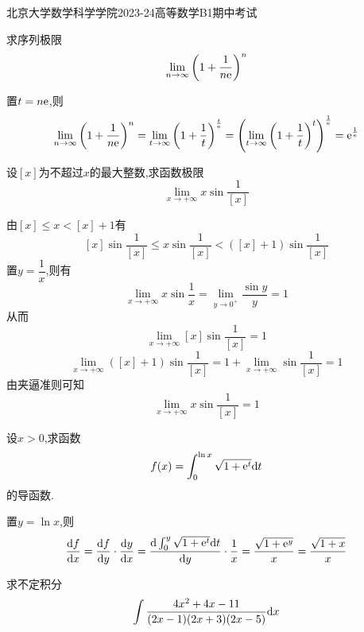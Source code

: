 \documentclass{ctexart}
\begin{document}
\pagestyle{empty}
\begin{center}\Large
    北京大学数学科学学院2023-24高等数学B1期中考试
\end{center}
\begin{problem}[1.(10\songti{分})]
    求序列极限$$\lim_{n\to\infty}{\left(1+\dfrac{1}{n\mathrm{e}}\right)^n}$$
\end{problem}
\begin{solution}
    置$t=n\mathrm{e}$,则
    $$
    \lim_{n\to\infty}{\left(1+\dfrac{1}{n\mathrm{e}}\right)^n}
    =\lim_{t\to\infty}{\left(1+\dfrac{1}{t}\right)^{\frac{t}{\mathrm{e}}}}
    =\left(\lim_{t\to\infty}{\left(1+\dfrac{1}{t}\right)^t}\right)^{\frac{1}{\mathrm{e}}}
    =\mathrm{e}^{\frac{1}{\mathrm{e}}}
    $$
\end{solution}
\begin{problem}[2.(10\songti{分})]
    设$[x]$为不超过$x$的最大整数,求函数极限$$\lim_{x\to+\infty}{x\sin{\dfrac{1}{[x]}}}$$
\end{problem}
\begin{solution}
    由$[x]\leqslant x<[x]+1$有
    $$[x]\sin{\dfrac{1}{[x]}}\leqslant x\sin{\dfrac{1}{[x]}}<([x]+1)\sin{\dfrac{1}{[x]}}$$
    置$y=\dfrac{1}{x}$,则有$$\lim_{x\to+\infty}{x\sin{\dfrac{1}{x}}}=\lim_{y\to 0^+}{\dfrac{\sin y}{y}}=1$$
    从而$$\lim_{x\to+\infty}{[x]\sin{\dfrac{1}{[x]}}}=1$$
    $$\lim_{x\to+\infty}{([x]+1)\sin{\dfrac{1}{[x]}}}=1+\lim_{x\to+\infty}{\sin{\dfrac{1}{[x]}}}=1$$
    由夹逼准则可知$$\lim_{x\to+\infty}{x\sin{\dfrac{1}{[x]}}}=1$$
\end{solution}
\begin{problem}[3.(10\songti{分})]
    设$x>0$,求函数$$f(x)=\int_{0}^{\ln{x}}{\sqrt{1+\mathrm{e}^t}\mathrm{d} t}$$的导函数.
\end{problem}
\begin{solution}
    置$y=\ln{x}$,则
    $$\dfrac{\mathrm{d} f}{\mathrm{d} x}=\dfrac{\mathrm{d} f}{\mathrm{d} y}\cdot\dfrac{\mathrm{d} y}{\mathrm{d} x}
    =\dfrac{\mathrm{d}\int_{0}^{y}{\sqrt{1+\mathrm{e}^t}\mathrm{d} t}}{\mathrm{d} y}\cdot\dfrac{1}{x}
    =\dfrac{\sqrt{1+\mathrm{e}^y}}{x}=\dfrac{\sqrt{1+x}}{x}$$
\end{solution}
\begin{problem}[4.(10\songti{分})]
    求不定积分$$\int{\dfrac{4x^2+4x-11}{(2x-1)(2x+3)(2x-5)}\mathrm{d}x}$$
\end{problem}
\end{document}
